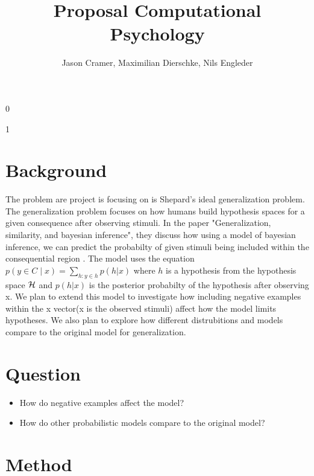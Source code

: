 \documentclass[]{scrartcl}
\title{Proposal Computational Psychology}
\begin{document}
\def\isblind{1}
\if\isblind0
    \author{Jason Cramer, Maximilian Dierschke, Nils Engleder}\fi
\if \isblind1
    \author{}\fi
\maketitle
\section{Background}
The problem are project is focusing on is Shepard's ideal generalization problem. The generalization problem focuses on how humans build hypothesis spaces for a given consequence after observing stimuli.
In the paper "Generalization, similarity, and bayesian inference", they discuss how using a model of bayesian inference, we can predict the probabilty of given stimuli being included within the consequential region \cite{Tenenbaum}.
The model uses the equation $p(y \in C \mid x) = \sum\limits_{h:y\in h} p(h | x)$ where $h$ is a hypothesis from the hypothesis space ${\cal H}$ and $p(h | x)$ is the posterior probabilty of  the hypothesis after observing x.
We plan to extend this model to investigate how including negative examples within the x vector(x is the observed stimuli) affect how the model limits hypotheses. We also plan to explore how different distrubitions and models compare to the original model for generalization.
\section{Question}
\begin{itemize}
\item How do negative examples affect the model?
\item How do other probabilistic models compare to the original model?
\end{itemize}
\section{Method}

\nocite{*}
\printbibliography
\end{document}
